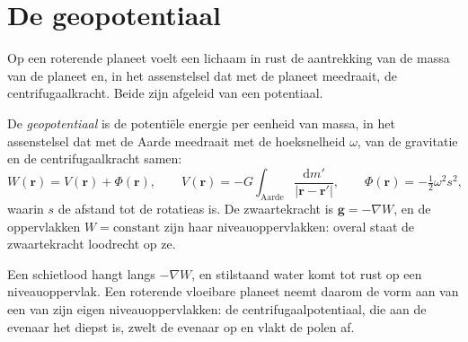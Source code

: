 \section{De geopotentiaal}

Op een roterende planeet voelt een lichaam in rust de aantrekking van de massa van de planeet
en, in het assenstelsel dat met de planeet meedraait, de centrifugaalkracht. Beide zijn afgeleid
van een potentiaal.

\begin{definition}[Geopotentiaal]\label{def:b3:gravity-geodesy:geopotential}
De \emph{geopotentiaal} is de potentiële energie per eenheid van
massa, in het assenstelsel dat met de Aarde meedraait met de hoeksnelheid $\omega$, van
de gravitatie en de centrifugaalkracht samen:
\[
  W(\mathbf r) = V(\mathbf r) + \Phi(\mathbf r),\qquad
  V(\mathbf r) = -G\int_{\text{Aarde}}\frac{\mathrm dm'}{|\mathbf r - \mathbf r'|},\qquad
  \Phi(\mathbf r) = -\tfrac12\omega^2 s^2,
\]
waarin $s$ de afstand tot de rotatieas is. De zwaartekracht is
$\mathbf g = -\nabla W$, en de oppervlakken $W = \text{constant}$ zijn haar
niveauoppervlakken: overal staat de zwaartekracht loodrecht op ze.
\end{definition}

Een schietlood hangt langs $-\nabla W$, en stilstaand water komt tot rust op een
niveauoppervlak. Een roterende vloeibare planeet neemt daarom de vorm aan van een van zijn eigen
niveauoppervlakken: de centrifugaalpotentiaal, die aan de evenaar het diepst is, zwelt de
evenaar op en vlakt de polen af.

